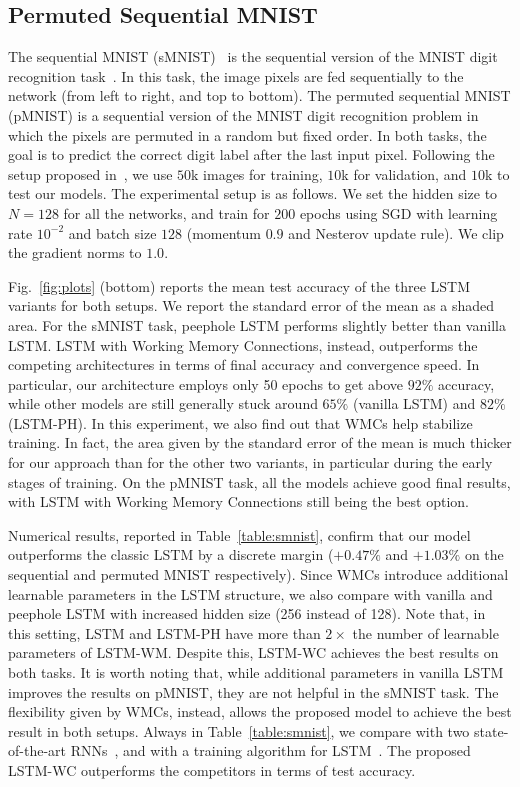 \subsection{Permuted Sequential MNIST}
\label{sec:smnist}
The sequential MNIST (sMNIST)~\citep{le2015simple} is the sequential version of the MNIST digit recognition task~\citep{lecun1998gradient}. In this task, the image pixels are fed sequentially to the network (from left to right, and top to bottom). The permuted sequential MNIST (pMNIST) is a sequential version of the MNIST digit recognition problem in which the pixels are permuted in a random but fixed order. In both tasks, the goal is to predict the correct digit label after the last input pixel. Following the setup proposed in~\citep{arpit2018h}, we use $50$k images for training, $10$k for validation, and $10$k to test our models.
%
The experimental setup is as follows. We set the hidden size to $N=128$ for all the networks, and train for $200$ epochs using SGD with learning rate $10^{-2}$ and batch size $128$ (momentum $0.9$ and Nesterov update rule). We clip the gradient norms to $1.0$.

Fig.~\ref{fig:plots} (bottom) reports the mean test accuracy of the three LSTM variants for both setups. We report the standard error of the mean as a shaded area. For the sMNIST task, peephole LSTM performs slightly better than vanilla LSTM. LSTM with Working Memory Connections, instead, outperforms the competing architectures in terms of final accuracy and convergence speed. In particular, our architecture employs only 50 epochs to get above $92\%$ accuracy, while other models are still generally stuck around $65\%$ (vanilla LSTM) and $82\%$ (LSTM-PH). In this experiment, we also find out that WMCs help stabilize training. In fact, the area given by the standard error of the mean is much thicker for our approach than for the other two variants, in particular during the early stages of training.
On the pMNIST task, all the models achieve good final results, with LSTM with Working Memory Connections still being the best option.



Numerical results, reported in Table~\ref{table:smnist}, confirm that our model outperforms the classic LSTM by a discrete margin ($+0.47\%$ and $+1.03\%$ on the sequential and permuted MNIST respectively). Since WMCs introduce additional learnable parameters in the LSTM structure, we also compare with vanilla and peephole LSTM with increased hidden size (256 instead of 128). Note that, in this setting, LSTM and LSTM-PH have more than $2\times$ the number of learnable parameters of LSTM-WM. Despite this, LSTM-WC achieves the best results on both tasks. It is worth noting that, while additional parameters in vanilla LSTM improves the results on pMNIST, they are not helpful in the sMNIST task. The flexibility given by WMCs, instead, allows the proposed model to achieve the best result in both setups.
%
Always in Table~\ref{table:smnist}, we compare with two state-of-the-art RNNs~\citep{le2015simple,arjovsky2016unitary}, and with a training algorithm for LSTM~\citep{arpit2018h}. The proposed LSTM-WC outperforms the competitors in terms of test accuracy.

